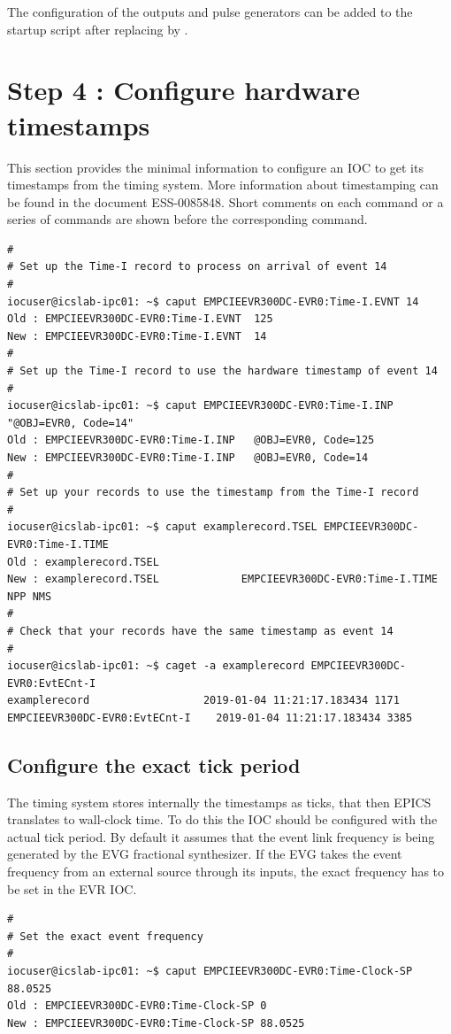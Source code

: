 \documentclass[11pt
  , a4paper
  , article
  , oneside
  , showtrims
]{memoir}
\begin{document}
{The configuration of the outputs and pulse generators can be added to the startup script after  replacing  by .


\section{Step 4 : Configure hardware timestamps}
This section provides the minimal information to configure an IOC to get its timestamps from the timing system. More information about timestamping can be found in the document ESS-0085848. Short comments on each command or a series of commands are shown before the corresponding command.
\begin{lstlisting}[style=termstyle]
#
# Set up the Time-I record to process on arrival of event 14
#
iocuser@icslab-ipc01: ~$ caput EMPCIEEVR300DC-EVR0:Time-I.EVNT 14
Old : EMPCIEEVR300DC-EVR0:Time-I.EVNT  125
New : EMPCIEEVR300DC-EVR0:Time-I.EVNT  14
#
# Set up the Time-I record to use the hardware timestamp of event 14
#
iocuser@icslab-ipc01: ~$ caput EMPCIEEVR300DC-EVR0:Time-I.INP "@OBJ=EVR0, Code=14"
Old : EMPCIEEVR300DC-EVR0:Time-I.INP   @OBJ=EVR0, Code=125
New : EMPCIEEVR300DC-EVR0:Time-I.INP   @OBJ=EVR0, Code=14
#
# Set up your records to use the timestamp from the Time-I record
#
iocuser@icslab-ipc01: ~$ caput examplerecord.TSEL EMPCIEEVR300DC-EVR0:Time-I.TIME
Old : examplerecord.TSEL
New : examplerecord.TSEL             EMPCIEEVR300DC-EVR0:Time-I.TIME NPP NMS
#
# Check that your records have the same timestamp as event 14
#
iocuser@icslab-ipc01: ~$ caget -a examplerecord EMPCIEEVR300DC-EVR0:EvtECnt-I
examplerecord                  2019-01-04 11:21:17.183434 1171
EMPCIEEVR300DC-EVR0:EvtECnt-I    2019-01-04 11:21:17.183434 3385
\end{lstlisting}

\subsection{Configure the exact tick period}
The timing system stores internally the timestamps as ticks, that then EPICS translates to wall-clock time. To do this the IOC should be configured with the actual tick period. By default it assumes that the event link frequency is being generated by the EVG fractional synthesizer. If the EVG takes the event frequency from an external source through its inputs, the exact frequency has to be set in the EVR IOC.
\begin{lstlisting}[style=termstyle]
#
# Set the exact event frequency
#
iocuser@icslab-ipc01: ~$ caput EMPCIEEVR300DC-EVR0:Time-Clock-SP 88.0525
Old : EMPCIEEVR300DC-EVR0:Time-Clock-SP 0
New : EMPCIEEVR300DC-EVR0:Time-Clock-SP 88.0525
\end{lstlisting}


}
\end{document}
